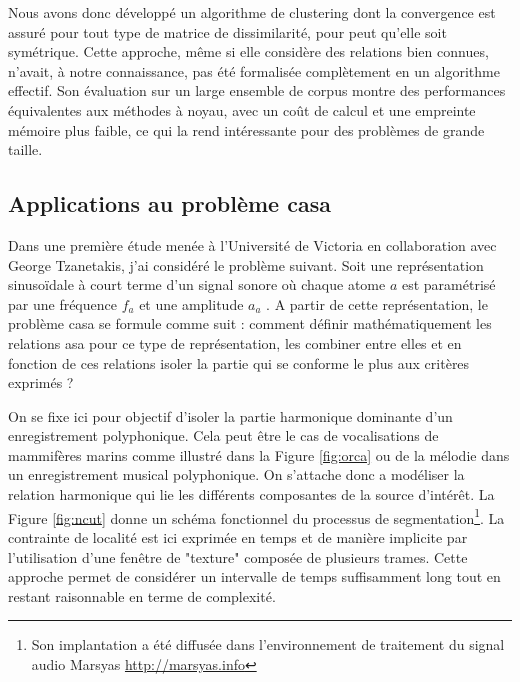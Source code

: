   Nous avons donc développé un algorithme de clustering dont la convergence est assuré pour tout type de matrice de dissimilarité, pour peut qu'elle soit symétrique. Cette approche, même si elle considère des relations bien connues, n'avait, à notre connaissance, pas été formalisée complètement en un algorithme effectif. Son évaluation sur un large ensemble de corpus \cite{keogh} montre des performances équivalentes aux méthodes à noyau, avec un coût de calcul et une empreinte mémoire plus faible, ce qui la rend intéressante pour des problèmes de grande taille\cite{rossignolKaverages}.

  \subsection{Applications au problème casa}

  Dans une première étude menée à l'Université de Victoria en collaboration avec George Tzanetakis, j'ai considéré le problème suivant. Soit une représentation sinusoïdale à court terme d'un signal sonore où chaque atome $a$ est paramétrisé par une fréquence $f_a$ et une amplitude $a_a$ . A partir de cette représentation, le problème casa se formule comme suit : comment définir mathématiquement les relations asa pour ce type de représentation, les combiner entre elles et en fonction de ces relations isoler la partie qui se conforme le plus aux critères exprimés ?

  On se fixe ici pour objectif d'isoler la partie harmonique dominante d'un enregistrement polyphonique. Cela peut être le cas de vocalisations de mammifères marins comme illustré dans la Figure \ref{fig:orca} ou de la mélodie dans un enregistrement musical polyphonique. On s'attache donc a modéliser la relation harmonique qui lie les différents composantes de la source d'intérêt. La Figure \ref{fig:ncut} donne un schéma fonctionnel du processus de segmentation\footnote{Son implantation a été diffusée dans l'environnement de traitement du signal audio Marsyas \url{http://marsyas.info}}. La contrainte de localité est ici exprimée en temps et de manière implicite par l'utilisation d'une fenêtre de "texture" composée de plusieurs trames. Cette approche permet de considérer un intervalle de temps suffisamment long tout en restant raisonnable en terme de complexité.

